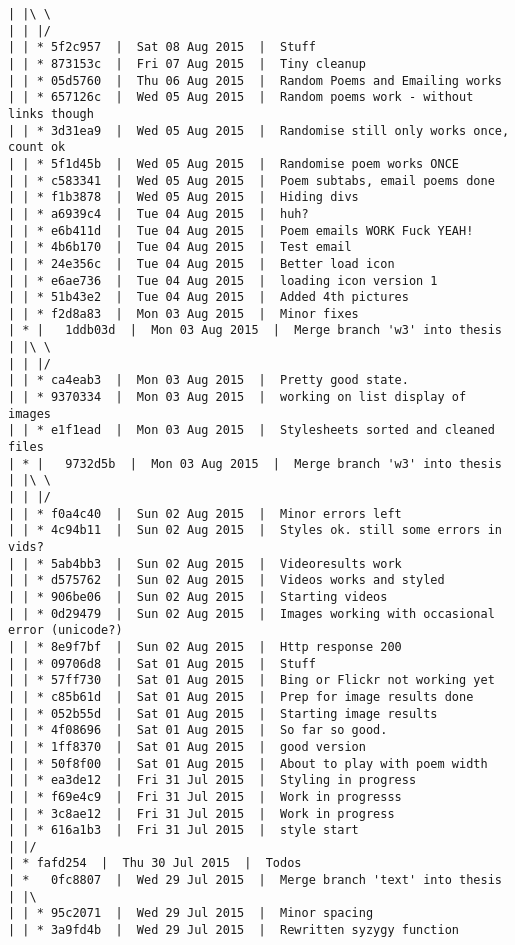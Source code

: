 \begin{verbatim}
| |\ \  
| | |/  
| | * 5f2c957  |  Sat 08 Aug 2015  |  Stuff
| | * 873153c  |  Fri 07 Aug 2015  |  Tiny cleanup
| | * 05d5760  |  Thu 06 Aug 2015  |  Random Poems and Emailing works
| | * 657126c  |  Wed 05 Aug 2015  |  Random poems work - without links though
| | * 3d31ea9  |  Wed 05 Aug 2015  |  Randomise still only works once, count ok
| | * 5f1d45b  |  Wed 05 Aug 2015  |  Randomise poem works ONCE
| | * c583341  |  Wed 05 Aug 2015  |  Poem subtabs, email poems done
| | * f1b3878  |  Wed 05 Aug 2015  |  Hiding divs
| | * a6939c4  |  Tue 04 Aug 2015  |  huh?
| | * e6b411d  |  Tue 04 Aug 2015  |  Poem emails WORK Fuck YEAH!
| | * 4b6b170  |  Tue 04 Aug 2015  |  Test email
| | * 24e356c  |  Tue 04 Aug 2015  |  Better load icon
| | * e6ae736  |  Tue 04 Aug 2015  |  loading icon version 1
| | * 51b43e2  |  Tue 04 Aug 2015  |  Added 4th pictures
| | * f2d8a83  |  Mon 03 Aug 2015  |  Minor fixes
| * |   1ddb03d  |  Mon 03 Aug 2015  |  Merge branch 'w3' into thesis
| |\ \  
| | |/  
| | * ca4eab3  |  Mon 03 Aug 2015  |  Pretty good state.
| | * 9370334  |  Mon 03 Aug 2015  |  working on list display of images
| | * e1f1ead  |  Mon 03 Aug 2015  |  Stylesheets sorted and cleaned files
| * |   9732d5b  |  Mon 03 Aug 2015  |  Merge branch 'w3' into thesis
| |\ \  
| | |/  
| | * f0a4c40  |  Sun 02 Aug 2015  |  Minor errors left
| | * 4c94b11  |  Sun 02 Aug 2015  |  Styles ok. still some errors in vids?
| | * 5ab4bb3  |  Sun 02 Aug 2015  |  Videoresults work
| | * d575762  |  Sun 02 Aug 2015  |  Videos works and styled
| | * 906be06  |  Sun 02 Aug 2015  |  Starting videos
| | * 0d29479  |  Sun 02 Aug 2015  |  Images working with occasional error (unicode?)
| | * 8e9f7bf  |  Sun 02 Aug 2015  |  Http response 200
| | * 09706d8  |  Sat 01 Aug 2015  |  Stuff
| | * 57ff730  |  Sat 01 Aug 2015  |  Bing or Flickr not working yet
| | * c85b61d  |  Sat 01 Aug 2015  |  Prep for image results done
| | * 052b55d  |  Sat 01 Aug 2015  |  Starting image results
| | * 4f08696  |  Sat 01 Aug 2015  |  So far so good.
| | * 1ff8370  |  Sat 01 Aug 2015  |  good version
| | * 50f8f00  |  Sat 01 Aug 2015  |  About to play with poem width
| | * ea3de12  |  Fri 31 Jul 2015  |  Styling in progress
| | * f69e4c9  |  Fri 31 Jul 2015  |  Work in progresss
| | * 3c8ae12  |  Fri 31 Jul 2015  |  Work in progress
| | * 616a1b3  |  Fri 31 Jul 2015  |  style start
| |/  
| * fafd254  |  Thu 30 Jul 2015  |  Todos
| *   0fc8807  |  Wed 29 Jul 2015  |  Merge branch 'text' into thesis
| |\  
| | * 95c2071  |  Wed 29 Jul 2015  |  Minor spacing
| | * 3a9fd4b  |  Wed 29 Jul 2015  |  Rewritten syzygy function

\end{verbatim}

